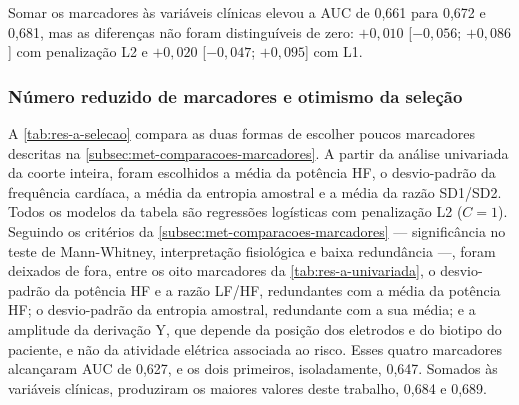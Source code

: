 Somar os marcadores às variáveis clínicas elevou a \gls{AUC} de 0,661 para
0,672 e 0,681, mas as diferenças não foram distinguíveis de zero:
$+0{,}010$ [$-0{,}056$; $+0{,}086$] com penalização L2 e $+0{,}020$
[$-0{,}047$; $+0{,}095$] com L1.

\subsubsection{Número reduzido de marcadores e otimismo da seleção}

A \autoref{tab:res-a-selecao} compara as duas formas de escolher poucos
marcadores descritas na \autoref{subsec:met-comparacoes-marcadores}. A
partir da análise univariada da coorte inteira, foram escolhidos a média da
potência HF, o desvio-padrão da frequência cardíaca, a média da entropia
amostral e a média da razão SD1/SD2. Todos os modelos da tabela são
regressões logísticas com penalização L2 ($C = 1$). Seguindo os critérios da
\autoref{subsec:met-comparacoes-marcadores} --- significância no teste de
Mann-Whitney, interpretação fisiológica e baixa redundância ---, foram
deixados de fora, entre os oito marcadores da \autoref{tab:res-a-univariada},
o desvio-padrão da potência HF e a razão LF/HF, redundantes com a média da
potência HF; o desvio-padrão da entropia amostral, redundante com a sua
média; e a amplitude da derivação Y, que depende da posição dos eletrodos e
do biotipo do paciente, e não da atividade elétrica associada ao risco. Esses quatro marcadores alcançaram
\gls{AUC} de 0,627, e os dois primeiros, isoladamente, 0,647. Somados às
variáveis clínicas, produziram os maiores valores deste trabalho, 0,684 e
0,689.

